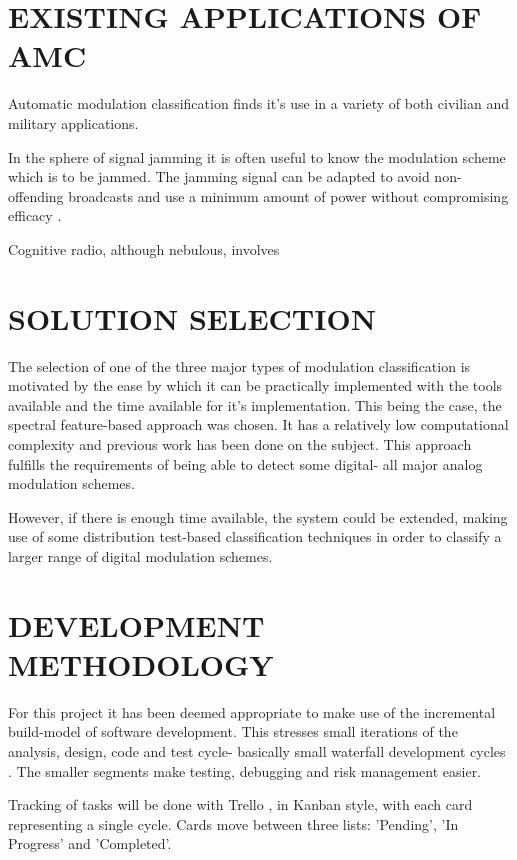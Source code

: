 \documentclass[10pt,onecolumn]{witseiepaper}
\begin{document}
\begin{multicols}{2}
\section{EXISTING APPLICATIONS OF AMC}
Automatic modulation classification finds it's use in a variety of both civilian and military applications. 

In the sphere of signal jamming it is often useful to know the modulation scheme which is to be jammed. The jamming signal can be adapted to avoid non-offending broadcasts and use a minimum amount of power without compromising efficacy \cite{azzouz2013automatic}.

Cognitive radio, although nebulous, involves




\section{SOLUTION SELECTION}
	The selection of one of the three major types of modulation classification is motivated by the ease by which it can be practically implemented with the tools available and the time available for it's implementation. 
	This being the case, the spectral feature-based approach was chosen. It has a relatively low computational complexity and previous work has been done on the subject. This approach fulfills the requirements of being able to detect some digital- all major analog modulation schemes.

	However, if there is enough time available, the system could be extended, making use of some distribution test-based classification techniques in order to classify a larger range of digital modulation schemes.

\section{DEVELOPMENT METHODOLOGY} 
	For this project it has been deemed appropriate to make use of the incremental build-model of software development. This stresses small iterations of the analysis, design, code and test cycle- basically small waterfall development cycles \cite{incremental_model, waterfall_model}. The smaller segments make testing, debugging and risk management easier.

	Tracking of tasks will be done with Trello \cite{trello}, in Kanban style, with each card representing a single cycle\cite{kanban_model}. Cards move between three lists: 'Pending', 'In Progress' and 'Completed'.


\end{multicols}
\end{document}

